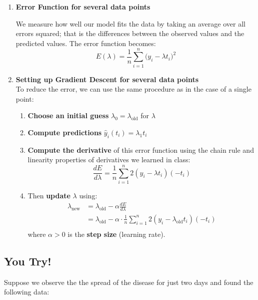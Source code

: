\documentclass[11pt]{article}
\begin{document}
\begin{enumerate}
\item \textbf{Error Function for several data points}

We measure how well our model fits the data by taking an average over all errors squared; that is the differences between the observed values and the predicted values. The error function becomes:
\[
E(\lambda) = \frac{1}{n} \sum_{i=1}^{n} \big(y_i - \lambda t_i \big)^2
\]
\item \textbf{Setting up Gradient Descent for several data points} \\
To reduce the error, we can use the same procedure as in the case of a single point:
    \begin{enumerate}
    \item[(a)] \textbf{Choose an initial guess} $\lambda_0 = \lambda_{\text{old}}$ for $\lambda$
    \item[(b)] \textbf{Compute predictions} $\hat{y}_i(t_i) = \lambda_1 t_i$\\

    \item[(c)] \textbf{Compute the derivative} of this error function using the chain rule and linearity properties of derivatives we learned in class:
    \[\frac{dE}{d\lambda} = \frac{1}{n} \sum_{i=1}^{n} 2(y_i - \lambda t_i)(-t_i)\]
    \item[(d)] Then \textbf{update} $\lambda$ using:
    \begin{align*}
    \lambda_{\text{new}} &= \lambda_{\text{old}} - \alpha \frac{dE}{d\lambda} \\
    &= \lambda_{\text{old}} - \alpha \cdot\frac{1}{n} \sum_{i=1}^{n} 2(y_i - \lambda_{\text{old}} t_i)(-t_i)\\
    \end{align*}
    where $\alpha > 0$ is the \textbf{step size} (learning rate).
    \end{enumerate}
\end{enumerate}
\subsection*{You Try!}

Suppose we observe the the spread of the disease for just two days and found the following data:
\end{document}
